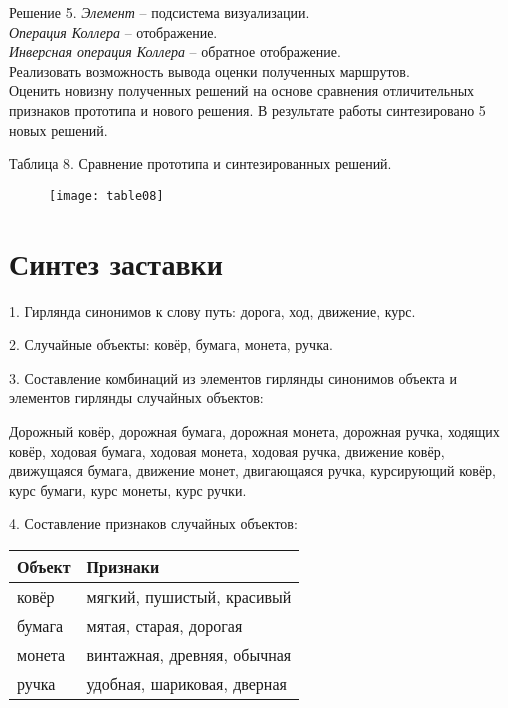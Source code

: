 Решение 5.
\emph{Элемент} -- подсистема визуализации.\\
\emph{Операция Коллера} -- отображение.\\
\emph{Инверсная операция Коллера} -- обратное отображение.\\
Реализовать возможность вывода оценки полученных маршрутов.\\

Оценить новизну полученных решений на основе сравнения отличительных признаков прототипа и нового решения. 
В результате работы синтезировано 5 новых решений.

\pagebreak

Таблица 8. Сравнение прототипа и синтезированных решений. 
\begin{figure}[h!]
    \center
    \texttt{[image: table08]}
\end{figure}

\chapter{Синтез заставки}
1. Гирлянда синонимов к слову путь: дорога, ход, движение, курс.

2. Случайные объекты: ковёр, бумага, монета, ручка.

3. Составление комбинаций из элементов гирлянды синонимов объекта и элементов гирлянды случайных объектов:

Дорожный ковёр, дорожная бумага, дорожная монета, дорожная ручка, ходящих ковёр, ходовая бумага, 
ходовая монета, ходовая ручка, движение ковёр, движущаяся бумага, движение монет, двигающаяся ручка, 
курсирующий ковёр, курс бумаги, курс монеты, курс ручки.

4. Составление признаков случайных объектов:
\begin{table}[h!]
    \center
    \begin{tabularx}{\textwidth}{|X|X|}
        \hline
        Объект & Признаки \\ \hline
        ковёр & мягкий, пушистый, красивый \\ \hline
        бумага & мятая, старая, дорогая \\ \hline
        монета & винтажная, древняя, обычная \\ \hline
        ручка & удобная, шариковая, дверная \\ \hline
    \end{tabularx}
\end{table}

